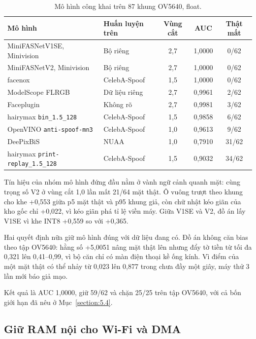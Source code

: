 \documentclass[../DoAn.tex]{subfiles}
\begin{document}
\begin{table}[!htb]
\centering
\small
\caption{Mô hình công khai trên 87 khung OV5640, float.}
\label{tab:mo_hinh_cong_khai}
\begin{tabular}{|L{5.2cm}|L{3.2cm}|c|c|c|}
\hline
\textbf{Mô hình} & \textbf{Huấn luyện trên} & \textbf{Vùng cắt} & \textbf{AUC} & \textbf{Thật mất} \\
\hline
MiniFASNetV1SE, Minivision & Bộ riêng & 2,7 & 1,0000 & 0/62 \\
\hline
MiniFASNetV2, Minivision & Bộ riêng & 2,7 & 1,0000 & 0/62 \\
\hline
facenox & CelebA-Spoof & 1,5 & 1,0000 & 0/62 \\
\hline
ModelScope FLRGB & Dữ liệu riêng & 2,7 & 0,9961 & 2/62 \\
\hline
Faceplugin & Không rõ & 2,7 & 0,9981 & 3/62 \\
\hline
hairymax \texttt{bin\_1.5\_128} & CelebA-Spoof & 1,5 & 0,9858 & 6/62 \\
\hline
OpenVINO \texttt{anti-spoof-mn3} & CelebA-Spoof & 1,0 & 0,9613 & 9/62 \\
\hline
DeePixBiS & NUAA & 1,0 & 0,7910 & 31/62 \\
\hline
hairymax \texttt{print-replay\_1.5\_128} & CelebA-Spoof & 1,5 & 0,9032 & 34/62 \\
\hline
\end{tabular}
\end{table}

Tín hiệu của nhóm mô hình đứng đầu nằm ở vành ngữ cảnh quanh mặt: cùng trọng số V2 ở vùng cắt 1,0 lần mất 21/64 mặt thật. Ô vuông trượt theo khung cho khe +0,553 giữa
p5 mặt thật và p95 khung giả, còn chữ nhật kéo giãn của kho gốc chỉ +0,022, vì kéo giãn phá tỉ lệ viền máy. Giữa V1SE và V2, đồ án lấy V1SE vì khe INT8 +0,559 so với
+0,365.

Hai quyết định nữa giữ mô hình đúng với dữ liệu đang có. Đồ án không căn bias theo tập OV5640: hằng số +5,0051 nâng mặt thật lên nhưng đẩy tờ tiền từ tối đa 0,321 lên
0,41--0,99, vì bộ căn chỉ có màn điện thoại kề ống kính. Vì điểm của một mặt thật có thể nhảy từ 0,023 lên 0,877 trong chưa đầy một giây, máy thử 3 lần mới báo giả
mạo.

Kết quả là AUC 1,0000, giữ 59/62 và chặn 25/25 trên tập OV5640, với cả bốn giới hạn đã nêu ở Mục~\ref{section:5.4}. 

\subsection{Giữ RAM nội cho Wi-Fi và DMA}
\label{section:5.8.4}
\end{document}
